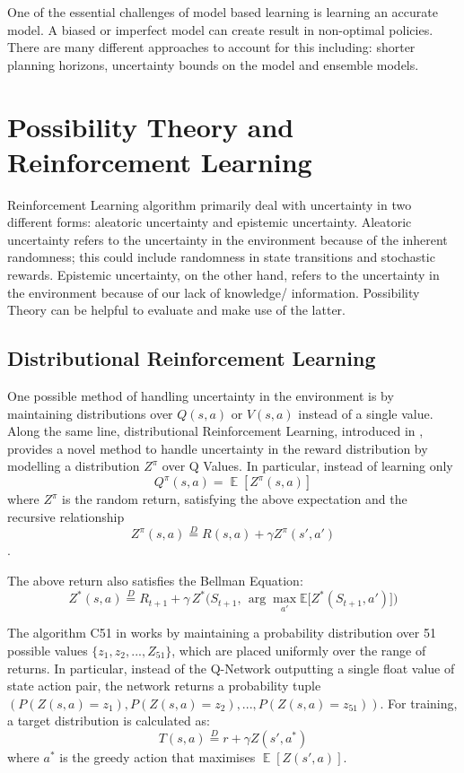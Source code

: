 \documentclass[12pt,a4paper]{report}
\DeclareMathOperator{\EX}{\mathbb{E}}
\begin{document}
One of the essential challenges of model based learning is learning an accurate model. A biased or imperfect model can create result in non-optimal policies. There are many different approaches to account for this including: shorter planning horizons, uncertainty bounds on the model and ensemble models. 

\section{Possibility Theory and Reinforcement Learning}
Reinforcement Learning algorithm primarily deal with uncertainty in two different forms: aleatoric uncertainty and epistemic uncertainty. Aleatoric uncertainty refers to the uncertainty in the environment because of the inherent randomness; this could include randomness in state transitions and stochastic rewards. Epistemic uncertainty, on the other hand, refers to the uncertainty in the environment because of our lack of knowledge/ information. Possibility Theory can be helpful to evaluate and make use of the latter. 

\subsection{Distributional Reinforcement Learning}
One possible method of handling uncertainty in the environment is by maintaining distributions over $Q(s,a)$ or $V(s,a)$ instead of a single value. Along the same line, distributional Reinforcement Learning, introduced in \cite{bellemare2017}, provides a novel method to handle uncertainty in the reward distribution by modelling a distribution $Z^\pi$ over Q Values. In particular, instead of learning only 
\[
  Q^\pi(s,a) = \EX[Z^\pi(s,a)]
\]
where $Z^\pi$ is the random return, satisfying the above expectation and the recursive relationship 
\[Z^\pi(s,a) \overset{D}{=} R(s,a) + \gamma Z^\pi(s', a')\]. 

The above return also satisfies the Bellman Equation:
\[
Z^*(s,a) \overset{D}{=} R_{t+1} + \gamma \, Z^*\Big(S_{t+1}, \, \arg\max_{a'} \mathbb{E}\big[Z^*(S_{t+1}, a')\big]\Big)
\]
\par
The algorithm C51 in \cite{bellemare2017} works by maintaining a probability distribution over 51 possible values $\{z_1, z_2, ..., Z_51\}$, which are placed uniformly over the range of returns. In particular, instead of the Q-Network outputting a single float value of state action pair, the network returns a probability tuple $(P(Z(s,a) = z_1),P(Z(s,a) = z_2), ... , P(Z(s,a) = z_51))$. For training, a target distribution is calculated as: 
\[T(s,a) \overset{D}{=} r + \gamma Z(s', a^*)\]
where $a^*$ is the greedy action that maximises $\EX[Z(s', a)]$. \par
\end{document}
